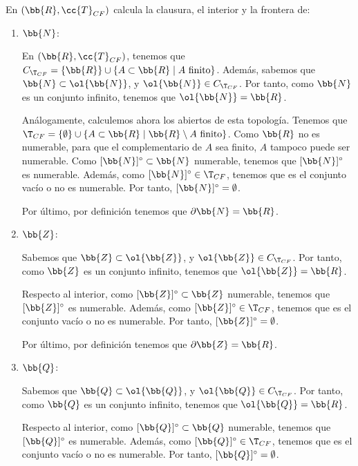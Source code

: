 \begin{ejercicio}
    En $(\bb{R}, \cc{T}_{CF})$ calcula la clausura, el interior y la frontera de:
    \begin{enumerate}
        \item $\bb{N}$:

            En $(\bb{R}, \cc{T}_{CF})$, tenemos que $C_{\T_{CF}}=\{\bb{R}\}\cup \{A\subset \bb{R} \mid A \text{ finito}\}$. Además, sabemos que $\bb{N}\subset \ol{\bb{N}}$, y $\ol{\bb{N}}\in C_{\T_{CF}}$. Por tanto, como $\bb{N}$ es un conjunto infinito, tenemos que $\ol{\bb{N}}=\bb{R}$.

            Análogamente, calculemos ahora los abiertos de esta topología. Tenemos que $\T_{CF}=\{\emptyset\}\cup \{A\subset \bb{R}\mid \bb{R}\setminus A\text{ finito}\}$. Como $\bb{R}$ no es numerable, para que el complementario de $A$ sea finito, $A$ tampoco puede ser numerable. Como $[\bb{N}]^\circ \subset \bb{N}$ numerable, tenemos que $[\bb{N}]^\circ$ es numerable. Además, como $[\bb{N}]^\circ \in \T_{CF}$, tenemos que es el conjunto vacío o no es numerable. Por tanto, $[\bb{N}]^\circ = \emptyset$.
            
            Por último, por definición tenemos que $\partial \bb{N}=\bb{R}$.
            
        \item $\bb{Z}$:
            
            Sabemos que $\bb{Z}\subset \ol{\bb{Z}}$, y $\ol{\bb{Z}}\in C_{\T_{CF}}$. Por tanto, como $\bb{Z}$ es un conjunto infinito, tenemos que $\ol{\bb{Z}}=\bb{R}$.

            Respecto al interior, como $[\bb{Z}]^\circ \subset \bb{Z}$ numerable, tenemos que $[\bb{Z}]^\circ$ es numerable. Además, como $[\bb{Z}]^\circ \in \T_{CF}$, tenemos que es el conjunto vacío o no es numerable. Por tanto, $[\bb{Z}]^\circ = \emptyset$.

            Por último, por definición tenemos que $\partial \bb{Z}=\bb{R}$.
            
        \item $\bb{Q}$:
        
            Sabemos que $\bb{Q}\subset \ol{\bb{Q}}$, y $\ol{\bb{Q}}\in C_{\T_{CF}}$. Por tanto, como $\bb{Q}$ es un conjunto infinito, tenemos que $\ol{\bb{Q}}=\bb{R}$.

            Respecto al interior, como $[\bb{Q}]^\circ \subset \bb{Q}$ numerable, tenemos que $[\bb{Q}]^\circ$ es numerable. Además, como $[\bb{Q}]^\circ \in \T_{CF}$, tenemos que es el conjunto vacío o no es numerable. Por tanto, $[\bb{Q}]^\circ = \emptyset$.


\end{enumerate}
\end{ejercicio}
